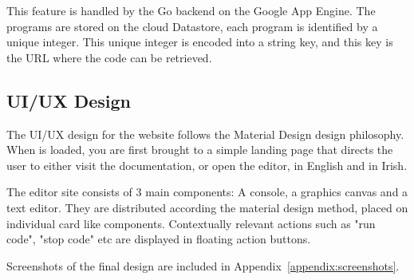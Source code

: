 This feature is handled by the Go backend on the Google App Engine. The programs are stored on the cloud Datastore, each program is identified by a unique integer. This unique integer is encoded into a string key, and this key is the URL where the code can be retrieved.

\subsection{UI/UX Design}

The UI/UX design for the \trys{} website follows the Material Design\cite{material-design} design philosophy. When \trys{} is loaded, you are first brought to a simple landing page that directs the user to either visit the documentation, or open the editor, in English and in Irish.

The editor site consists of 3 main components: A console, a graphics canvas and a text editor. They are distributed according the material design method, placed on individual card like components. Contextually relevant actions such as "run code", "stop code" etc are displayed in floating action buttons.

Screenshots of the final design are included in Appendix~\ref{appendix:screenshots}.
